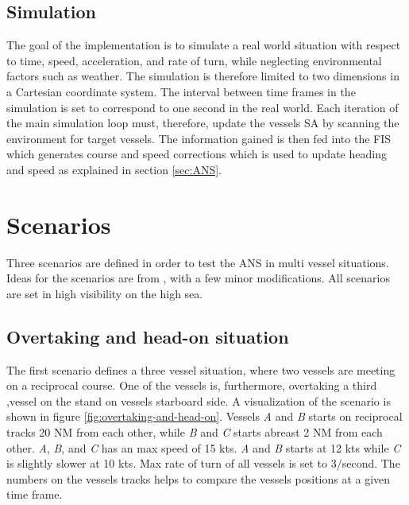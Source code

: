 \section{Simulation}
The goal of the implementation is to  simulate a real world situation with respect to time, speed, acceleration, and rate of turn, while neglecting  environmental factors such as weather.
The simulation is therefore limited to two dimensions in a Cartesian coordinate system.
The interval between time frames in the simulation is set to correspond to one second in the real world.
Each iteration of the main simulation loop must, therefore, update the vessels SA by scanning the environment for target vessels. The information gained is then fed into the FIS which generates course and speed corrections which is used to update heading and speed as explained in section \ref{sec:ANS}.
\chapter{Scenarios}
\label{sec:overtaking-and-head-on}
Three scenarios are defined in order to test the ANS in multi vessel situations. Ideas for the scenarios are from \textcite{ecolreg_overtaking-and-crossing-2,ecolreg_overtaking-and-crossing-3,ecolreg_overtaking-and-crossing,ecolreg_overtaking-and-head-on}, with a few minor modifications. All scenarios are set in high visibility on the high sea.
\section{Overtaking and head-on situation}
The first scenario defines a three vessel situation, where two vessels are meeting on a reciprocal course. One of the vessels is, furthermore, overtaking a third ,vessel on the stand on vessels starboard side. A visualization of the scenario is shown in figure \ref{fig:overtaking-and-head-on}. Vessels \textit{A} and \textit{B} starts on reciprocal tracks 20 NM from each other, while \textit{B} and \textit{C} starts abreast 2 NM from each other. \textit{A}, \textit{B}, and \textit{C} has an max speed of 15 kts. \textit{A} and \textit{B} starts at 12 kts while \textit{C} is slightly slower at 10 kts. Max rate of turn of all vessels is set to 3\textdegree/second. The numbers on the vessels tracks helps to compare the vessels positions at a given time frame.

